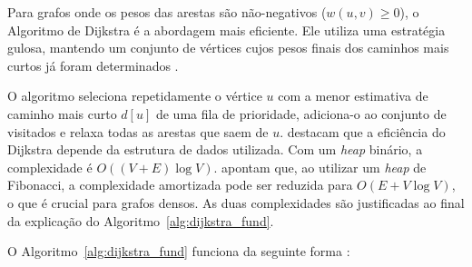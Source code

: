 Para grafos onde os pesos das arestas são não-negativos ($w(u,v)\geq 0$), o Algoritmo de Dijkstra é a abordagem mais eficiente. Ele utiliza uma estratégia gulosa, mantendo um conjunto de vértices cujos pesos finais dos caminhos mais curtos já foram determinados \cite{aho}.

O algoritmo seleciona repetidamente o vértice $u$ com a menor estimativa de caminho mais curto $d[u]$ de uma fila de prioridade, adiciona-o ao conjunto de visitados e relaxa todas as arestas que saem de $u$.  destacam que a eficiência do Dijkstra depende da estrutura de dados utilizada. Com um \textit{heap} binário, a complexidade é $O((V+E)\log V)$.  apontam que, ao utilizar um \textit{heap} de Fibonacci, a complexidade amortizada pode ser reduzida para $O(E + V\log V)$, o que é crucial para grafos densos. As duas complexidades são justificadas ao final da explicação do Algoritmo~\ref{alg:dijkstra_fund}.

\begin{algorithm}[H]
    \DontPrintSemicolon
    \SetAlgoLined

    \caption{Algoritmo de Dijkstra \cite{cormen}}
    \label{alg:dijkstra_fund}
\end{algorithm}

O Algoritmo~\ref{alg:dijkstra_fund} funciona da seguinte forma \cite{cormen}:

